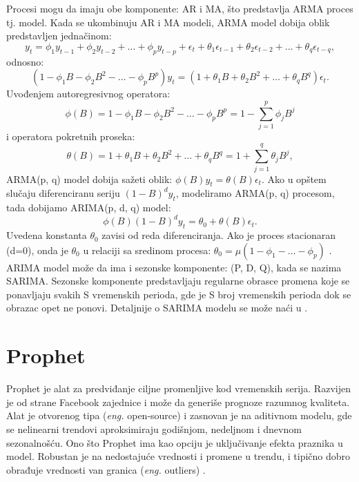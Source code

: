 \documentclass[12pt,oneside]{memoir}
\begin{document}
Procesi mogu da imaju obe komponente: AR i MA, što predstavlja ARMA proces tj. model. Kada se ukombinuju AR i MA modeli, ARMA model dobija oblik predstavljen jednačinom:
\begin{equation*}
y_t = \phi_1y_{t-1} + \phi_2y_{t-2} + \dots + \phi_py_{t-p} + \epsilon_t + \theta_1\epsilon_{t-1} + \theta_2\epsilon_{t-2} + \dots + \theta_q\epsilon_{t-q},
\end{equation*}
odnosno:
\begin{equation*}
(1-\phi_1B-\phi_2B^2-\dots-\phi_pB^p)y_t = (1+\theta_1B+\theta_2B^2+\dots+\theta_qB^q)\epsilon_t.
\end{equation*}
Uvođenjem autoregresivnog operatora: 
$$\phi(B)=1-\phi_1B-\phi_2B^2-\dots-\phi_pB^p=1-\sum\limits_{j=1}^{p}\phi_jB^j$$
i operatora pokretnih proseka:
$$\theta(B)=1+\theta_1B+\theta_2B^2+\dots+\theta_qB^q=1+\sum\limits_{j=1}^{q}\theta_jB^j,$$
ARMA(p, q) model dobija sažeti oblik:
$\phi(B)y_t = \theta(B)\epsilon_t.$
Ako u opštem slučaju diferenciranu seriju $(1-B)^dy_t$, modeliramo ARMA(p, q) procesom, tada dobijamo ARIMA(p, d, q) model:
$$\phi(B)(1-B)^dy_t = \theta_0 + \theta(B)\epsilon_t.$$
Uvedena konstanta $\theta_0$ zavisi od reda diferenciranja. Ako je proces stacionaran (d=0), onda je $\theta_0$ u relaciji sa sredinom procesa: $\theta_0=\mu(1-\phi_1-\dots-\phi_p)$ \cite{zlatko}.\\
ARIMA model može da ima i sezonske komponente: (P, D, Q), kada se nazima SARIMA. Sezonske komponente predstavljaju regularne obrasce promena koje se ponavljaju svakih S vremenskih perioda, gde je S broj vremenskih perioda dok se obrazac opet ne ponovi. Detaljnije o SARIMA modelu se može naći u \cite{hyndman2018forecasting}.

\section{Prophet}
Prophet je alat za predviđanje ciljne promenljive kod vremenskih serija. Razvijen je od strane Facebook zajednice \cite{prophet} i može da generiše prognoze razumnog kvaliteta. Alat je otvorenog tipa (\textit{eng.} open-source) i zasnovan je na aditivnom modelu, gde se nelinearni trendovi aproksimiraju godišnjom, nedeljnom i dnevnom sezonalnošću. Ono što Prophet ima kao opciju je uključivanje efekta praznika u model. Robustan je na nedostajuće vrednosti i promene u trendu, i tipično dobro obrađuje vrednosti van granica (\textit{eng.} outliers) \cite{zunic2020application}.
\end{document}
